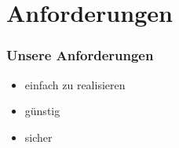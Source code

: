\section{Anforderungen}
\begin{frame}
	\frametitle{Unsere Anforderungen}
	\begin{itemize}
		\item einfach zu realisieren
		\item günstig
		\item sicher
	\end{itemize}
\end{frame}